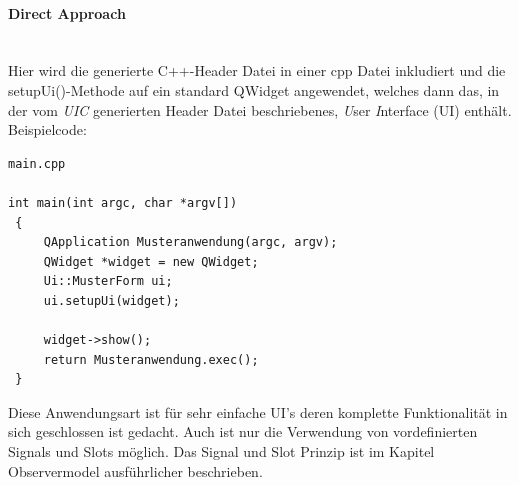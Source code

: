 \paragraph{Direct Approach}\mbox{}\\
Hier wird die generierte C++-Header Datei in einer cpp Datei inkludiert und die setupUi()-Methode auf ein standard QWidget angewendet, welches dann das, in der vom \textit{UIC} generierten Header Datei beschriebenes, \textit{U}ser \textit{I}nterface (UI) enthält.\\Beispielcode:
\begin{lstlisting}
main.cpp

int main(int argc, char *argv[])
 {
     QApplication Musteranwendung(argc, argv);
     QWidget *widget = new QWidget;
     Ui::MusterForm ui;
     ui.setupUi(widget);

     widget->show();
     return Musteranwendung.exec();
 }
\end{lstlisting}
Diese Anwendungsart ist für sehr einfache UI’s deren komplette Funktionalität in sich geschlossen ist gedacht. Auch ist nur die Verwendung von vordefinierten Signals und Slots möglich. Das Signal und Slot Prinzip ist im Kapitel Observermodel ausführlicher beschrieben.
\newpage
